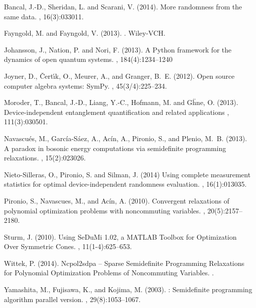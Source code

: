 \documentclass{article}
\begin{document}
\begin{thebibliography}{}

Bancal, J.-D., Sheridan, L. and Scarani, V. (2014). 
\newblock More randomness from the same data.
, 16(3):033011.

Fayngold, M. and Fayngold, V. (2013).
.
\newblock Wiley-VCH.

Johansson, J., Nation, P. and Nori, F. (2013).
\newblock A Python framework for the dynamics of open quantum systems.
, 184(4):1234--1240

Joyner, D., {\v{C}}ert{\'\i}k, O., Meurer, A., and Granger, B.~E. (2012).
\newblock Open source computer algebra systems: {SymPy}.
, 45(3/4):225--234.

Moroder, T., Bancal, J.-D., Liang, Y.-C., Hofmann, M. and G\"hne, O. (2013).
\newblock Device-independent entanglement quantification and related applications
, 111(3):030501.

Navascu\'es, M., Garc\'ia-S\'aez, A., Ac\'in, A., Pironio, S., and Plenio, M.~B. (2013).
\newblock A paradox in bosonic energy computations via semidefinite programming relaxations.
, 15(2):023026.

Nieto-Silleras, O., Pironio, S. and Silman, J. (2014)
\newblock Using complete measurement statistics for optimal device-independent randomness evaluation.
, 16(1):013035.

Pironio, S., Navascues, M., and Ac\'in, A. (2010).
\newblock Convergent relaxations of polynomial optimization problems with
  noncommuting variables.
, 20(5):2157--2180.

Sturm, J. (2010).
\newblock Using SeDuMi 1.02, a MATLAB Toolbox for Optimization Over Symmetric Cones.
, 11(1-4):625--653.

Wittek, P. (2014). 
\newblock Ncpol2sdpa -- Sparse Semidefinite Programming Relaxations for Polynomial Optimization Problems of Noncommuting Variables. 
.

Yamashita, M., Fujisawa, K., and Kojima, M. (2003).
: Semidefinite programming algorithm parallel version.
, 29(8):1053--1067.

\end{thebibliography}
\end{document}
